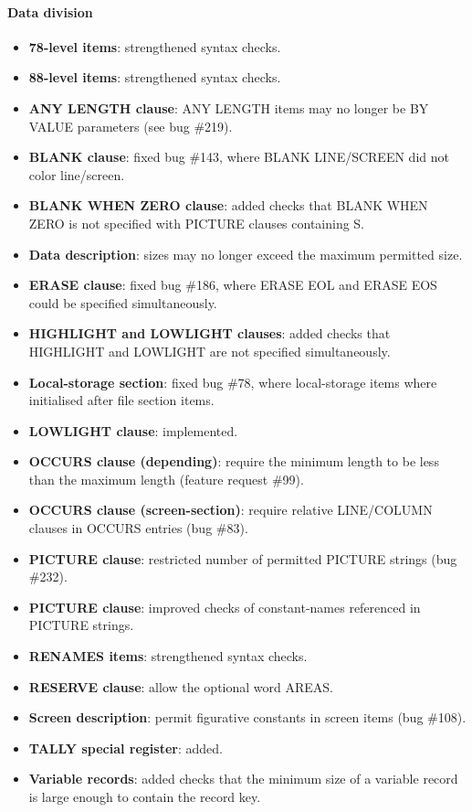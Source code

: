\paragraph{Data division}
\begin{itemize}
\item \textbf{78-level items}: strengthened syntax checks.
\item \textbf{88-level items}: strengthened syntax checks.
\item \textbf{ANY LENGTH clause}: ANY LENGTH items may no longer be BY VALUE parameters (see bug \#219).
\item \textbf{BLANK clause}: fixed bug \#143, where BLANK LINE\slash{}SCREEN did not color line\slash{}screen.
\item \textbf{BLANK WHEN ZERO clause}: added checks that BLANK WHEN ZERO is not specified with PICTURE clauses containing S.
\item \textbf{Data description}: sizes may no longer exceed the maximum permitted size.
\item \textbf{ERASE clause}: fixed bug \#186, where ERASE EOL and ERASE EOS could be specified simultaneously.
\item \textbf{HIGHLIGHT and LOWLIGHT clauses}: added checks that HIGHLIGHT and LOWLIGHT are not specified simultaneously.
\item \textbf{Local-storage section}: fixed bug \#78, where local-storage items where initialised after file section items.
\item \textbf{LOWLIGHT clause}: implemented.
\item \textbf{OCCURS clause (depending)}: require the minimum length to be less than the maximum length (feature request \#99).
\item \textbf{OCCURS clause (screen-section)}: require relative LINE\slash{}COLUMN clauses in OCCURS entries (bug \#83).
\item \textbf{PICTURE clause}: restricted number of permitted PICTURE strings (bug \#232).
\item \textbf{PICTURE clause}: improved checks of constant-names referenced in PICTURE strings.
\item \textbf{RENAMES items}: strengthened syntax checks.
\item \textbf{RESERVE clause}: allow the optional word AREAS.
\item \textbf{Screen description}: permit figurative constants in screen items (bug \#108).
\item \textbf{TALLY special register}: added.
\item \textbf{Variable records}: added checks that the minimum size of a variable record is large enough to contain the record key.
\end{itemize}

